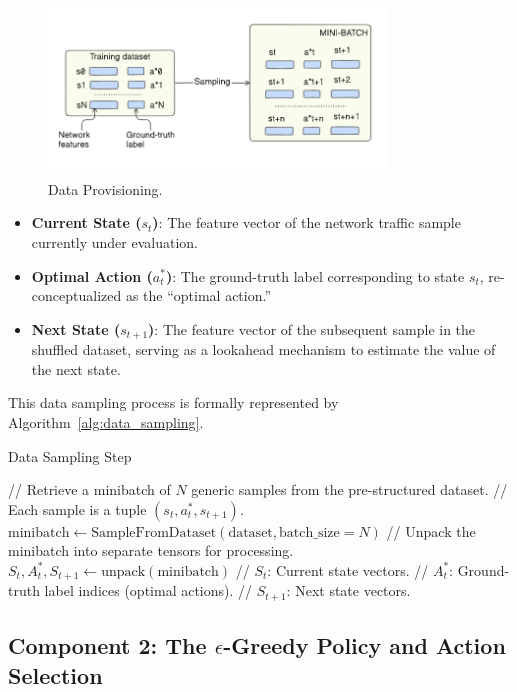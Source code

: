 \documentclass[12pt]{report}
\begin{document}
\begin{figure}[htbp]
    \centering
    \includegraphics[width=0.8\textwidth]{images/batching-arch.png}
    \caption{Data Provisioning.}
    \label{fig:batching-arch}
\end{figure}


\begin{itemize}
  \item \textbf{Current State (\( s_t \))}: The feature vector of the network traffic sample currently under evaluation.
  \item \textbf{Optimal Action (\( a^*_t \))}: The ground-truth label corresponding to state \( s_t \), re-conceptualized as the “optimal action.”
  \item \textbf{Next State (\( s_{t+1} \))}: The feature vector of the subsequent sample in the shuffled dataset, serving as a lookahead mechanism to estimate the value of the next state.
\end{itemize}

This data sampling process is formally represented by Algorithm~\ref{alg:data_sampling}.

\begin{algorithm}[H]
\caption{Data Sampling Step}
\label{alg:data_sampling}
\begin{algorithmic}[1]
\State // Retrieve a minibatch of \( N \) generic samples from the pre-structured dataset.
\State // Each sample is a tuple \( (s_t, a^*_t, s_{t+1}) \).
\State \( \text{minibatch} \gets \text{SampleFromDataset}(\text{dataset}, \text{batch\_size} = N) \)
\State // Unpack the minibatch into separate tensors for processing.
\State \( S_t, A^*_t, S_{t+1} \gets \text{unpack}(\text{minibatch}) \)
\State // \( S_t \): Current state vectors.
\State // \( A^*_t \): Ground-truth label indices (optimal actions).
\State // \( S_{t+1} \): Next state vectors.
\end{algorithmic}
\end{algorithm}

\subsection{Component 2: The $\epsilon$-Greedy Policy and Action Selection}
\end{document}
